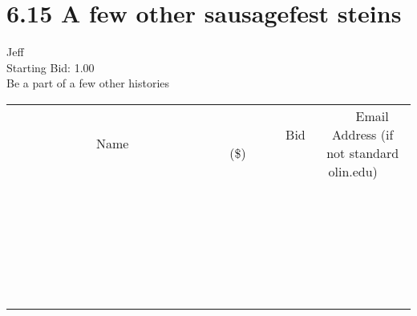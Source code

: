 \documentclass[11pt]{article}
\begin{document}
					\section*{6.15 A few other sausagefest steins}
					Jeff \\
					Starting Bid: 1.00 \\
					Be a part of a few other histories \\
					[6ex]
					\begin{tabular}{c c c}
						~~~~~~~~~~~~~Name~~~~~~~~~~~~~ & ~~~~~~~~~Bid (\$)~~~~~~~~~ & ~~~Email Address (if not standard olin.edu)~~~ \\
				
 & & \\
\hline
 & & \\
\hline
 & & \\
\hline
 & & \\
\hline
 & & \\
\hline
 & & \\
\hline
 & & \\
\hline
 & & \\
\hline
 & & \\
\hline
 & & \\
\hline
 & & \\
\hline
 & & \\
\hline
 & & \\
\hline
 & & \\
\hline
 & & \\
\hline
 & & \\
\hline
 & & \\
\hline
 & & \\
\hline
 & & \\
\hline
 & & \\
\hline
 & & \\
\hline
 & & \\
\hline
 & & \\
\hline
 & & \\
\hline
 & & \\
\hline
 & & \\
\hline
					\end{tabular}
					\clearpage
				
\end{document}

